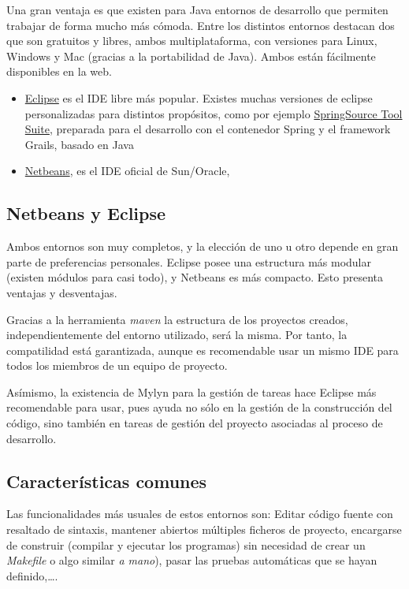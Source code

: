 \documentclass[11pt]{article}
\begin{document}
Una gran ventaja es que existen para Java entornos de desarrollo que permiten trabajar de forma mucho más cómoda. Entre los distintos entornos destacan dos que son gratuitos y libres, ambos multiplataforma, con versiones para Linux, Windows y Mac (gracias a la portabilidad de Java). Ambos están fácilmente disponibles en la web. 

\begin{itemize}
\item \href{http://eclipse.org/}{Eclipse} es el IDE libre más popular. Existes muchas versiones de eclipse personalizadas para distintos propósitos, como por ejemplo \href{http://www.springsource.org}{SpringSource Tool Suite}, preparada para el desarrollo con el contenedor Spring y el framework Grails, basado en Java
\item \href{http://netbeans.org/}{Netbeans}, es el IDE oficial de Sun/Oracle,
\end{itemize}


\subsection{Netbeans y Eclipse}
\label{sec-3-1}

Ambos entornos son muy completos, y la elección de uno u otro depende en gran parte de preferencias personales. Eclipse posee una estructura  más modular (existen módulos para casi todo), y Netbeans es más compacto. Esto presenta ventajas y 
desventajas. 

Gracias a la herramienta \emph{maven} la estructura de los proyectos creados, independientemente del entorno utilizado, será la misma. Por tanto, la
compatilidad está garantizada, aunque es recomendable usar un mismo IDE para todos los miembros de un equipo de proyecto.

Asímismo, la existencia de Mylyn para la gestión de tareas hace Eclipse más recomendable para usar, pues ayuda no sólo en la gestión de la construcción del código, sino también en tareas de gestión del proyecto asociadas al proceso de desarrollo.
 
\subsection{Características comunes}
\label{sec-3-2}

Las funcionalidades más usuales de estos entornos son: Editar código fuente con resaltado de sintaxis, mantener abiertos múltiples ficheros de proyecto, encargarse de construir (compilar y ejecutar los programas) sin necesidad de crear un \emph{Makefile} o algo similar \emph{a mano}), pasar las pruebas automáticas que se hayan definido,\ldots{}.
\end{document}

